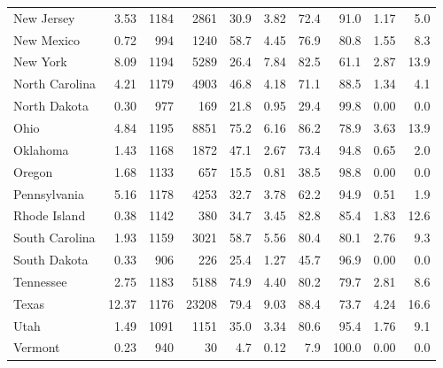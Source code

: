 \begin{tabular}{lrrrrrrrrr}
New Jersey & \num{3.53} & \num{1184} & \num{2861} & \num{30.9} & \num{3.82} & \num{72.4} & \num{91.0} & \num{1.17} & \num{5.0} \\
New Mexico & \num{0.72} & \num{994} & \num{1240} & \num{58.7} & \num{4.45} & \num{76.9} & \num{80.8} & \num{1.55} & \num{8.3} \\
New York & \num{8.09} & \num{1194} & \num{5289} & \num{26.4} & \num{7.84} & \num{82.5} & \num{61.1} & \num{2.87} & \num{13.9} \\
North Carolina & \num{4.21} & \num{1179} & \num{4903} & \num{46.8} & \num{4.18} & \num{71.1} & \num{88.5} & \num{1.34} & \num{4.1} \\
North Dakota & \num{0.30} & \num{977} & \num{169} & \num{21.8} & \num{0.95} & \num{29.4} & \num{99.8} & \num{0.00} & \num{0.0} \\
Ohio & \num{4.84} & \num{1195} & \num{8851} & \num{75.2} & \num{6.16} & \num{86.2} & \num{78.9} & \num{3.63} & \num{13.9} \\
Oklahoma & \num{1.43} & \num{1168} & \num{1872} & \num{47.1} & \num{2.67} & \num{73.4} & \num{94.8} & \num{0.65} & \num{2.0} \\
Oregon & \num{1.68} & \num{1133} & \num{657} & \num{15.5} & \num{0.81} & \num{38.5} & \num{98.8} & \num{0.00} & \num{0.0} \\
Pennsylvania & \num{5.16} & \num{1178} & \num{4253} & \num{32.7} & \num{3.78} & \num{62.2} & \num{94.9} & \num{0.51} & \num{1.9} \\
Rhode Island & \num{0.38} & \num{1142} & \num{380} & \num{34.7} & \num{3.45} & \num{82.8} & \num{85.4} & \num{1.83} & \num{12.6} \\
South Carolina & \num{1.93} & \num{1159} & \num{3021} & \num{58.7} & \num{5.56} & \num{80.4} & \num{80.1} & \num{2.76} & \num{9.3} \\
South Dakota & \num{0.33} & \num{906} & \num{226} & \num{25.4} & \num{1.27} & \num{45.7} & \num{96.9} & \num{0.00} & \num{0.0} \\
Tennessee & \num{2.75} & \num{1183} & \num{5188} & \num{74.9} & \num{4.40} & \num{80.2} & \num{79.7} & \num{2.81} & \num{8.6} \\
Texas & \num{12.37} & \num{1176} & \num{23208} & \num{79.4} & \num{9.03} & \num{88.4} & \num{73.7} & \num{4.24} & \num{16.6} \\
Utah & \num{1.49} & \num{1091} & \num{1151} & \num{35.0} & \num{3.34} & \num{80.6} & \num{95.4} & \num{1.76} & \num{9.1} \\
Vermont & \num{0.23} & \num{940} & \num{30} & \num{4.7} & \num{0.12} & \num{7.9} & \num{100.0} & \num{0.00} & \num{0.0} \\

\end{tabular}
